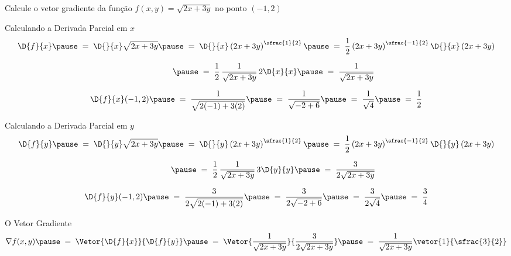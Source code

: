 \begin{question}
  Calcule o vetor gradiente da função \(f(x, y) = \sqrt{2x+3y}\)
  no ponto \((-1, 2)\)
\end{question}

\begin{resolution}{Calculando a Derivada Parcial em $x$}
  \[
    \D{f}{x}
    \pause
    \;=\; \D{}{x}\sqrt{2x+3y}
    \pause
    \;=\; \D{}{x}\left(2x+3y\right)^{\sfrac{1}{2}}
    \pause
    \;=\; \frac{1}{2}\left(2x+3y\right)^{\sfrac{-1}{2}}\D{}{x}\left(2x+3y\right)
  \]

  \[
    \hphantom{\D{f}{x}}
    \pause
    \;=\; \frac{1}{2}\,\frac{1}{\sqrt{2x+3y}}\, 2\D{x}{x}
    \pause
    \;=\; \frac{1}{\sqrt{2x+3y}}
  \]

  \pause
  \bigskip
  \[
    \D{f}{x}(-1, 2)
    \pause
    \;=\; \frac{1}{\sqrt{2(-1)+3(2)}}
    \pause
    \;=\; \frac{1}{\sqrt{-2+6}}
    \pause
    \;=\; \frac{1}{\sqrt{4}}
    \pause
    \;=\; \frac{1}{2}
  \]
\end{resolution}

\begin{resolution}{Calculando a Derivada Parcial em $y$}
  \[
    \D{f}{y}
    \pause
    \;=\; \D{}{y}\sqrt{2x+3y}
    \pause
    \;=\; \D{}{y}\left(2x+3y\right)^{\sfrac{1}{2}}
    \pause
    \;=\; \frac{1}{2}\left(2x+3y\right)^{\sfrac{-1}{2}}\D{}{y}\left(2x+3y\right)
  \]

  \[
    \hphantom{\D{f}{y}}
    \pause
    \;=\; \frac{1}{2}\,\frac{1}{\sqrt{2x+3y}}\, 3\D{y}{y}
    \pause
    \;=\; \frac{3}{2\sqrt{2x+3y}}
  \]

  \pause
  \bigskip
  \[
    \D{f}{y}(-1, 2)
    \pause
    \;=\; \frac{3}{2\sqrt{2(-1)+3(2)}}
    \pause
    \;=\; \frac{3}{2\sqrt{-2+6}}
    \pause
    \;=\; \frac{3}{2\sqrt{4}}
    \pause
    \;=\; \frac{3}{4}
  \]
\end{resolution}

\begin{resolution}{O Vetor Gradiente}
  \[
    \nabla f(x, y)
    \pause
    \;=\; \Vetor{\D{f}{x}}{\D{f}{y}}
    \pause
    \;=\; \Vetor{\frac{1}{\sqrt{2x+3y}}}{\frac{3}{2\sqrt{2x+3y}}}
    \pause
    \;=\; \frac{1}{\sqrt{2x+3y}} \vetor{1}{\sfrac{3}{2}}
  \]
\end{resolution}

